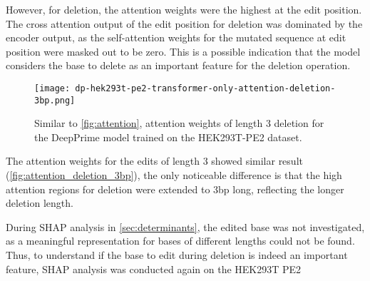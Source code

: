 However, for deletion, the attention weights were the highest at the edit position. The cross attention output of the edit position for deletion was dominated by the encoder output, as the self-attention weights for the mutated sequence at edit position were masked out to be zero. This is a possible indication that the model considers the base to delete as an important feature for the deletion operation.

\begin{figure}
    \centering
    \texttt{[image: dp-hek293t-pe2-transformer-only-attention-deletion-3bp.png]}
    \caption[Attention weights for 3-bp deletion of the DeepPrime model trained on the HEK293T-PE2 dataset]{Similar to \autoref{fig:attention}, attention weights of length 3 deletion for the DeepPrime model trained on the HEK293T-PE2 dataset.}
    \label{fig:attention_deletion_3bp}
\end{figure}

The attention weights for the edits of length 3 showed similar result (\autoref{fig:attention_deletion_3bp}), the only noticeable difference is that the high attention regions for deletion were extended to 3bp long, reflecting the longer deletion length.

During SHAP analysis in \autoref{sec:determinants}, the edited base was not investigated, as a meaningful representation for bases of different lengths could not be found. Thus, to understand if the base to edit during deletion is indeed an important feature, SHAP analysis was conducted again on the HEK293T PE2 